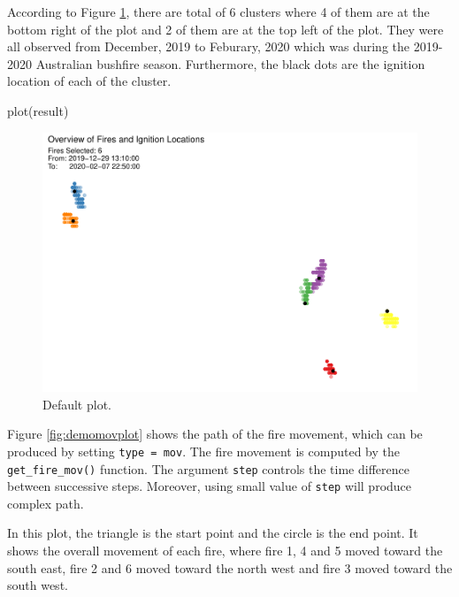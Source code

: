 According to Figure \ref{fig:demodefplot}, there are total of 6 clusters
where 4 of them are at the bottom right of the plot and 2 of them are at
the top left of the plot. They were all observed from December, 2019 to
Feburary, 2020 which was during the 2019-2020 Australian bushfire
season. Furthermore, the black dots are the ignition location of each of
the cluster.

\begin{Schunk}
\begin{Sinput}
plot(result)
\end{Sinput}
\begin{figure}

{\centering \includegraphics[width=0.8\linewidth]{clustering_paper_files/figure-latex/demodefplot-1} 

}

\caption[Default plot]{Default plot.}\label{fig:demodefplot}
\end{figure}
\end{Schunk}

Figure \ref{fig:demomovplot} shows the path of the fire movement, which
can be produced by setting
\texttt{type\ =\ \textquotesingle{}mov\textquotesingle{}}. The fire
movement is computed by the \texttt{get\_fire\_mov()} function. The
argument \texttt{step} controls the time difference between successive
steps. Moreover, using small value of \texttt{step} will produce complex
path.

In this plot, the triangle is the start point and the circle is the end
point. It shows the overall movement of each fire, where fire 1, 4 and 5
moved toward the south east, fire 2 and 6 moved toward the north west
and fire 3 moved toward the south west.

